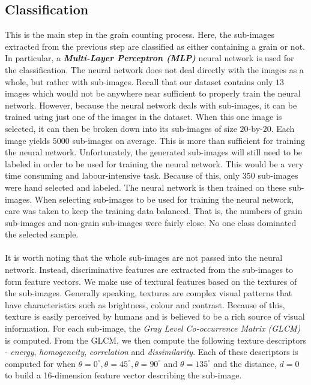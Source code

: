 \subsection{Classification}
This is the main step in the grain counting process. Here, the sub-images extracted from the previous step are classified as either containing a grain or not. In particular, a \textit{\textbf{Multi-Layer Perceptron (MLP)}} neural network is used for the classification. The neural network does not deal directly with the images as a whole, but rather with sub-images. Recall that our dataset contains only $13$ images which would not be anywhere near sufficient to properly train the neural network. However, because the neural network deals with sub-images, it can be trained using just one of the images in the dataset. When this one image is selected, it can then be broken down into its sub-images of size $20$-by-$20$. Each image yields $5000$ sub-images on average. This is more than sufficient for training the neural network. Unfortunately, the generated sub-images will still need to be labeled in order to be used for training the neural network. This would be a very time consuming and labour-intensive task. Because of this, only $350$ sub-images were hand selected and labeled. The neural network is then trained on these sub-images. When selecting sub-images to be used for training the neural network, care was taken to keep the training data balanced. That is, the numbers of grain sub-images and non-grain sub-images were fairly close. No one class dominated the selected sample.\\ \\
%
It is worth noting that the whole sub-images are not passed into the neural network. Instead, discriminative features are extracted from the sub-images to form feature vectors. We make use of textural features based on the textures of the sub-images. Generally speaking, textures are complex visual patterns that have characteristics such as brightness, colour and contrast. Because of this, texture is easily perceived by humans and is believed to be a rich source of
visual information. For each sub-image, the \textit{Gray Level Co-occurrence Matrix (GLCM)} is computed. From the GLCM, we then compute the following texture descriptors - \textit{energy}, \textit{homogeneity}, \textit{correlation} and \textit{dissimilarity}. Each of these descriptors is computed for when $\theta = 0^\circ, \theta = 45^\circ, \theta = 90^\circ$ and $\theta = 135^\circ$ and the distance, $d = 0$ to build a 16-dimension feature vector describing the sub-image.
